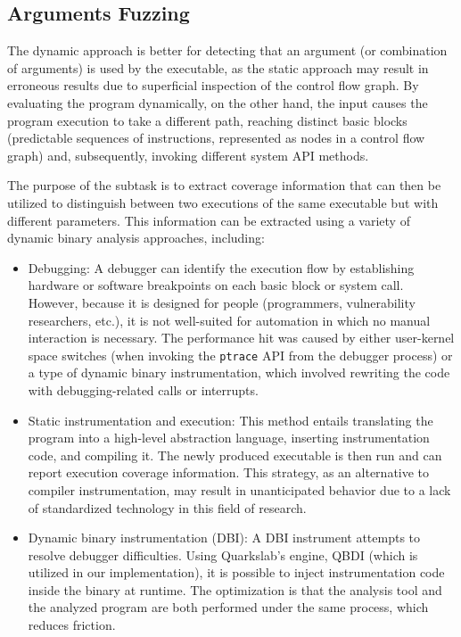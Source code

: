 \documentclass[../main.tex]{subfiles}
\begin{document}
\hypertarget{arguments-fuzzing}{%
\subsection{Arguments Fuzzing}\label{arguments-fuzzing}}

The dynamic approach is better for detecting that an argument (or
combination of arguments) is used by the executable, as the static
approach may result in erroneous results due to superficial inspection
of the control flow graph. By evaluating the program dynamically, on the
other hand, the input causes the program execution to take a different
path, reaching distinct basic blocks (predictable sequences of
instructions, represented as nodes in a control flow graph) and,
subsequently, invoking different system API methods.

The purpose of the subtask is to extract coverage information that can
then be utilized to distinguish between two executions of the same
executable but with different parameters. This information can be
extracted using a variety of dynamic binary analysis approaches,
including:

\begin{itemize}
\tightlist
\item
  Debugging: A debugger can identify the execution flow by establishing
  hardware or software breakpoints on each basic block or system call.
  However, because it is designed for people (programmers, vulnerability
  researchers, etc.), it is not well-suited for automation in which no
  manual interaction is necessary. The performance hit was caused by
  either user-kernel space switches (when invoking the \texttt{ptrace}
  API from the debugger process) or a type of dynamic binary
  instrumentation, which involved rewriting the code with
  debugging-related calls or interrupts.
\item
  Static instrumentation and execution: This method entails translating
  the program into a high-level abstraction language, inserting
  instrumentation code, and compiling it. The newly produced executable
  is then run and can report execution coverage information. This
  strategy, as an alternative to compiler instrumentation, may result in
  unanticipated behavior due to a lack of standardized technology in
  this field of research.
\item
  Dynamic binary instrumentation (DBI): A DBI instrument
  attempts to resolve debugger difficulties. Using Quarkslab's engine,
  QBDI (which is utilized in our implementation), it is possible to
  inject instrumentation code inside the binary at runtime. The
  optimization is that the analysis tool and the analyzed program are
  both performed under the same process, which reduces friction.
\end{itemize}
\end{document}
